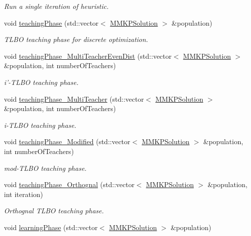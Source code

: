 \begin{DoxyCompactItemize}
\begin{DoxyCompactList}\small\item\em Run a single iteration of heuristic. \end{DoxyCompactList}\item 
\hypertarget{class_m_m_k_p___t_l_b_o_ab18aa71ce62a00663cedb6d7d8db6f38}{void \hyperlink{class_m_m_k_p___t_l_b_o_ab18aa71ce62a00663cedb6d7d8db6f38}{teaching\+Phase} (std\+::vector$<$ \hyperlink{class_m_m_k_p_solution}{M\+M\+K\+P\+Solution} $>$ \&population)}\label{class_m_m_k_p___t_l_b_o_ab18aa71ce62a00663cedb6d7d8db6f38}

\begin{DoxyCompactList}\small\item\em T\+L\+B\+O teaching phase for discrete optimization. \end{DoxyCompactList}\item 
void \hyperlink{class_m_m_k_p___t_l_b_o_a5421bce054c4197a536dfa374fda1653}{teaching\+Phase\+\_\+\+Multi\+Teacher\+Even\+Dist} (std\+::vector$<$ \hyperlink{class_m_m_k_p_solution}{M\+M\+K\+P\+Solution} $>$ \&population, int number\+Of\+Teachers)
\begin{DoxyCompactList}\small\item\em i'-\/\+T\+L\+B\+O teaching phase. \end{DoxyCompactList}\item 
void \hyperlink{class_m_m_k_p___t_l_b_o_a2e2ea3990fb62d5117672b278ec21e7e}{teaching\+Phase\+\_\+\+Multi\+Teacher} (std\+::vector$<$ \hyperlink{class_m_m_k_p_solution}{M\+M\+K\+P\+Solution} $>$ \&population, int number\+Of\+Teachers)
\begin{DoxyCompactList}\small\item\em i-\/\+T\+L\+B\+O teaching phase. \end{DoxyCompactList}\item 
void \hyperlink{class_m_m_k_p___t_l_b_o_af54ae5e4da4275df8d25eaaa916e3b01}{teaching\+Phase\+\_\+\+Modified} (std\+::vector$<$ \hyperlink{class_m_m_k_p_solution}{M\+M\+K\+P\+Solution} $>$ \&population, int number\+Of\+Teachers)
\begin{DoxyCompactList}\small\item\em mod-\/\+T\+L\+B\+O teaching phase. \end{DoxyCompactList}\item 
void \hyperlink{class_m_m_k_p___t_l_b_o_a6377147784c758b4f8e782b37f86be73}{teaching\+Phase\+\_\+\+Orthognal} (std\+::vector$<$ \hyperlink{class_m_m_k_p_solution}{M\+M\+K\+P\+Solution} $>$ \&population, int iteration)
\begin{DoxyCompactList}\small\item\em Orthognal T\+L\+B\+O teaching phase. \end{DoxyCompactList}\item 
\hypertarget{class_m_m_k_p___t_l_b_o_ae230bdd3c27355b3b89c23ba3de2cb29}{void \hyperlink{class_m_m_k_p___t_l_b_o_ae230bdd3c27355b3b89c23ba3de2cb29}{learning\+Phase} (std\+::vector$<$ \hyperlink{class_m_m_k_p_solution}{M\+M\+K\+P\+Solution} $>$ \&population)}\label{class_m_m_k_p___t_l_b_o_ae230bdd3c27355b3b89c23ba3de2cb29}


\end{DoxyCompactItemize}
